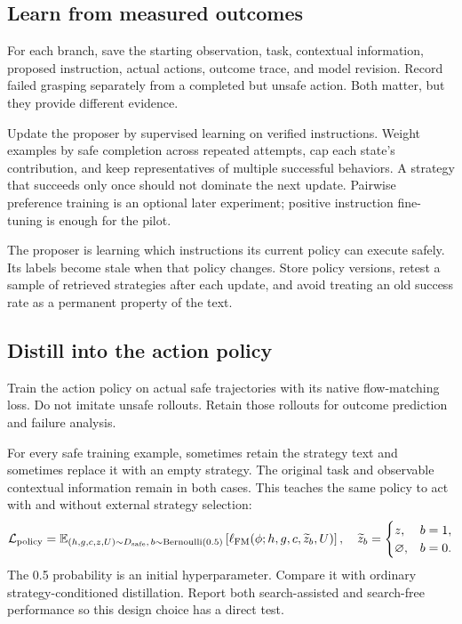 \documentclass[11pt]{article}
\newcommand{\E}{\mathbb{E}}
\begin{document}
\subsection{Learn from measured outcomes}

For each branch, save the starting observation, task, contextual information, proposed instruction, actual actions, outcome trace, and model revision. Record failed grasping separately from a completed but unsafe action. Both matter, but they provide different evidence.

Update the proposer by supervised learning on verified instructions. Weight examples by safe completion across repeated attempts, cap each state's contribution, and keep representatives of multiple successful behaviors. A strategy that succeeds only once should not dominate the next update. Pairwise preference training is an optional later experiment; positive instruction fine-tuning is enough for the pilot.

The proposer is learning which instructions its current policy can execute safely. Its labels become stale when that policy changes. Store policy versions, retest a sample of retrieved strategies after each update, and avoid treating an old success rate as a permanent property of the text.

\subsection{Distill into the action policy}

Train the action policy on actual safe trajectories with its native flow-matching loss. Do not imitate unsafe rollouts. Retain those rollouts for outcome prediction and failure analysis.

For every safe training example, sometimes retain the strategy text and sometimes replace it with an empty strategy. The original task and observable contextual information remain in both cases. This teaches the same policy to act with and without external strategy selection:
\begin{equation}
\mathcal L_{\rm policy}=
\E_{(h,g,c,z,U)\sim D_{\rm safe},\,b\sim\mathrm{Bernoulli}(0.5)}
\left[\ell_{\rm FM}\!\left(\phi;h,g,c,\widetilde z_b,U\right)\right],
\quad
\widetilde z_b=\begin{cases}z,&b=1,\\\varnothing,&b=0.\end{cases}
\end{equation}
The 0.5 probability is an initial hyperparameter. Compare it with ordinary strategy-conditioned distillation. Report both search-assisted and search-free performance so this design choice has a direct test.
\end{document}
